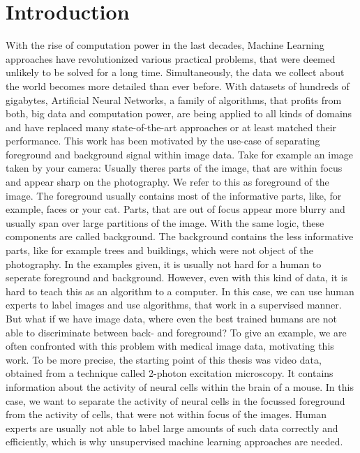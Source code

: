 \documentclass[12pt]{report}
\theoremstyle{definition}
\begin{document}
\chapter{Introduction}
With the rise of computation power in the last decades, Machine Learning approaches have revolutionized various practical problems, that were deemed unlikely to be solved for a long time. Simultaneously, the data we collect about the world becomes more detailed than ever before. With datasets of hundreds of gigabytes, Artificial Neural Networks, a family of algorithms, that profits from both, big data and computation power, are being applied to all kinds of domains and have replaced many state-of-the-art approaches or at least matched their performance.
This work has been motivated by the use-case of separating foreground and background signal within image data. Take for example an image taken by your camera: Usually theres parts of the image, that are within focus and appear sharp on the photography. We refer to this as foreground of the image. The foreground usually contains most of the informative parts, like, for example, faces or your cat. Parts, that are out of focus appear more blurry and usually span over large partitions of the image. With the same logic, these components are called background. The background contains the less informative parts, like for example trees and buildings, which were not object of the photography. In the examples given, it is usually not hard for a human to seperate foreground and background. However, even with this kind of data, it is hard to teach this as an algorithm to a computer. In this case, we can use human experts to label images and use algorithms, that work in a supervised manner. But what if we have image data, where even the best trained humans are not able to discriminate between back- and foreground? To give an example, we are often confronted with this problem with medical image data, motivating this work. To be more precise, the starting point of this thesis was video data, obtained from a technique called 2-photon excitation microscopy. It contains information about the activity of neural cells within the brain of a mouse. In this case, we want to separate the activity of neural cells in the focussed foreground from the activity of cells, that were not within focus of the images. Human experts are usually not able to label large amounts of such data correctly and efficiently, which is why unsupervised machine learning approaches are needed.
\end{document}
